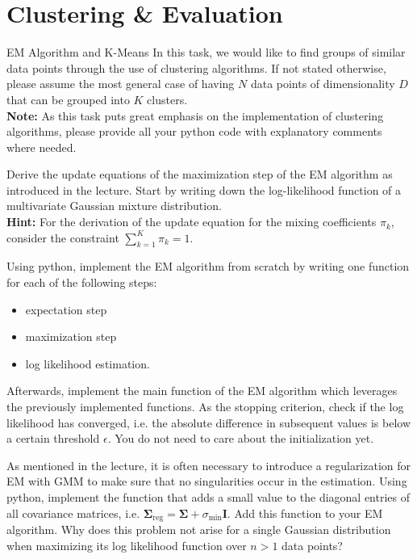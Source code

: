 \documentclass[
	ngerman,
	points=true,%
    solution=true,
    accentcolor=9c,
    colorbacktitle
	]{tudaexercise}
\begin{document}
\newpage

\section*{Clustering \& Evaluation}
\begin{task}{EM Algorithm and K-Means}
In this task, we would like to find groups of similar data points through the use of clustering algorithms. If not stated otherwise, please assume the most general case of having $N$ data points of dimensionality $D$ that can be grouped into $K$ clusters. \\
\textbf{Note:} As this task puts great emphasis on the implementation of clustering algorithms, please provide all your python code with explanatory comments where needed. 
\begin{subtask}
Derive the update equations of the maximization step of the EM algorithm as introduced in the lecture. Start by writing down the log-likelihood function of a multivariate Gaussian mixture distribution. \\
\textbf{Hint:} For the derivation of the update equation for the mixing coefficients $\pi_k$, consider the constraint $\sum_{k=1}^{K}\pi_k=1$. 
\end{subtask}
\begin{solution}

\end{solution}

\begin{subtask}
Using python, implement the EM algorithm from scratch by writing one function for each of the following steps:
\begin{itemize}
    \item expectation step
    \item maximization step
    \item log likelihood estimation.
\end{itemize}
Afterwards, implement the main function of the EM algorithm which leverages the previously implemented functions. As the stopping criterion, check if the log likelihood has converged, i.e. the absolute difference in subsequent values is below a certain threshold $\epsilon$. You do not need to care about the initialization yet. 
\end{subtask}
\begin{solution}
    
\end{solution}

\begin{subtask}
As mentioned in the lecture, it is often necessary to introduce a regularization for EM with GMM to make sure that no singularities occur in the estimation. Using python, implement the function that adds a small value to the diagonal entries of all covariance matrices, i.e. $\boldsymbol{\Sigma}_{\text{reg}}=\boldsymbol{\Sigma}+\sigma_{\text{min}}\boldsymbol{I}$. Add this function to your EM algorithm. Why does this problem not arise for a single Gaussian distribution when maximizing its log likelihood function over $n>1$ data points? 
\end{subtask}
\begin{solution}
    

\end{solution}
\end{task}
\end{document}
